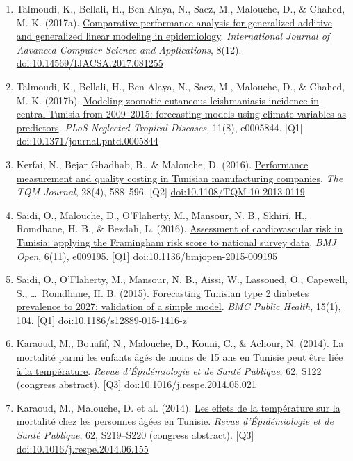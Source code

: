 \documentclass[10pt,a4paper]{article}
\newcommand{\doi}[1]{\href{https://doi.org/#1}{doi:#1}}
\newcommand{\Qu}[1]{[Q#1]}
\begin{document}
\begin{enumerate}[resume*]
\item Talmoudi, K., Bellali, H., Ben-Alaya, N., Saez, M., Malouche, D., \& Chahed, M. K. (2017a). \href{https://doi.org/10.14569/IJACSA.2017.081255}{Comparative performance analysis for generalized additive and generalized linear modeling in epidemiology}. \emph{International Journal of Advanced Computer Science and Applications}, 8(12). \doi{10.14569/IJACSA.2017.081255}
\item Talmoudi, K., Bellali, H., Ben-Alaya, N., Saez, M., Malouche, D., \& Chahed, M. K. (2017b). \href{https://doi.org/10.1371/journal.pntd.0005844}{Modeling zoonotic cutaneous leishmaniasis incidence in central Tunisia from 2009--2015: forecasting models using climate variables as predictors}. \emph{PLoS Neglected Tropical Diseases}, 11(8), e0005844. \Qu1 \doi{10.1371/journal.pntd.0005844}
\item Kerfai, N., Bejar Ghadhab, B., \& Malouche, D. (2016). \href{https://www.emerald.com/insight/content/doi/10.1108/TQM-10-2013-0119/full/html}{Performance measurement and quality costing in Tunisian manufacturing companies}. \emph{The TQM Journal}, 28(4), 588--596. \Qu2 \doi{10.1108/TQM-10-2013-0119}
\item Saidi, O., Malouche, D., O'Flaherty, M., Mansour, N. B., Skhiri, H., Romdhane, H. B., \& Bezdah, L. (2016). \href{https://doi.org/10.1136/bmjopen-2015-009195}{Assessment of cardiovascular risk in Tunisia: applying the Framingham risk score to national survey data}. \emph{BMJ Open}, 6(11), e009195. \Qu1 \doi{10.1136/bmjopen-2015-009195}
\item Saidi, O., O'Flaherty, M., Mansour, N. B., Aissi, W., Lassoued, O., Capewell, S., \ldots\ Romdhane, H. B. (2015). \href{https://bmcpublichealth.biomedcentral.com/articles/10.1186/s12889-015-1416-z}{Forecasting Tunisian type 2 diabetes prevalence to 2027: validation of a simple model}. \emph{BMC Public Health}, 15(1), 104. \Qu1 \doi{10.1186/s12889-015-1416-z}
\item Karaoud, M., Bouafif, N., Malouche, D., Kouni, C., \& Achour, N. (2014). \href{https://www.em-consulte.com/article/911510/article/la-mortalite-parmi-les-enfants-ages-de-moins-de15}{La mortalit\'e parmi les enfants \^ag\'es de moins de 15 ans en Tunisie peut \^etre li\'ee \`a la temp\'erature}. \emph{Revue d'\'Epid\'emiologie et de Sant\'e Publique}, 62, S122 (congress abstract). \Qu3 \doi{10.1016/j.respe.2014.05.021}
\item Karaoud, M., Malouche, D. et al. (2014). \href{https://www.em-consulte.com/article/915656/les-effets-de-la-temperature-sur-la-mortalite-chez}{Les effets de la temp\'erature sur la mortalit\'e chez les personnes \^ag\'ees en Tunisie}. \emph{Revue d'\'Epid\'emiologie et de Sant\'e Publique}, 62, S219--S220 (congress abstract). \Qu3 \doi{10.1016/j.respe.2014.06.155}

\end{enumerate}
\end{document}
